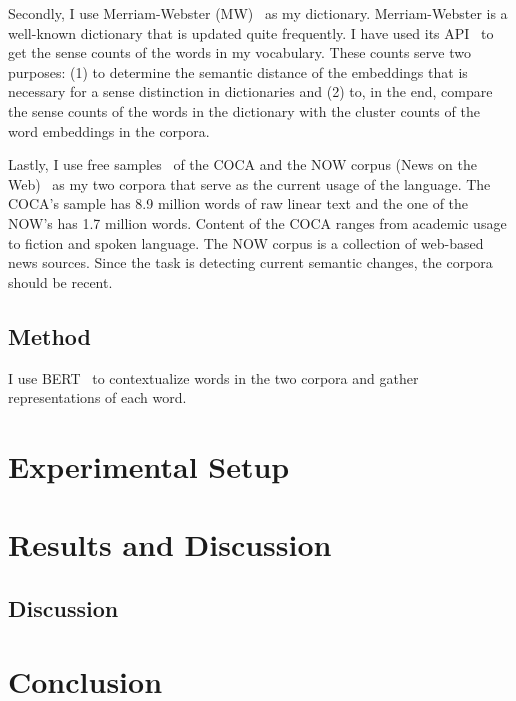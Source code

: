 \documentclass[11pt]{article}
\begin{document}
Secondly, I use Merriam-Webster (MW)~\cite{mw-2023-dictionary} as my dictionary.
Merriam-Webster is a well-known dictionary that is updated quite frequently.
I have used its API~\cite{mw-2023-api} to get the sense counts of the words in my vocabulary.
These counts serve two purposes: (1) to determine the semantic distance of the embeddings that is necessary for a sense distinction in dictionaries and (2) to, in the end, compare the sense counts of the words in the dictionary with the cluster counts of the word embeddings in the corpora.

Lastly, I use free samples~\cite{corpus-data-2023-corpora} of the COCA and the NOW corpus (News on the Web)~\cite{english-corpora-2016-now} as my two corpora that serve as the current usage of the language.
The COCA's sample has 8.9 million words of raw linear text and the one of the NOW's has 1.7 million words.
Content of the COCA ranges from academic usage to fiction and spoken language.
The NOW corpus is a collection of web-based news sources.
Since the task is detecting current semantic changes, the corpora should be recent.

\subsection{Method}

I use BERT~\cite{devlin-etal-2019-bert} to contextualize words in the two corpora and gather representations of each word.

\section{Experimental Setup}

\section{Results and Discussion}

\subsection{Discussion}

\section{Conclusion}



\end{document}
